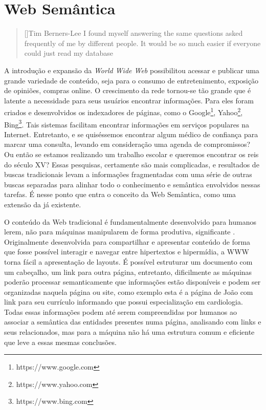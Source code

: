 \chapter{Web Semântica}

\begin{quotation}[]{Tim Berners-Lee}
I found myself answering the same questions asked frequently of me by different people. It would be so much easier if everyone could just read my database
\end{quotation}

A introdução e expansão da \textit{World Wide Web} possibilitou acessar e publicar uma grande variedade de conteúdo, seja para o consumo de entretenimento, exposição de opiniões, compras online. O crescimento da rede tornou-se tão grande que é latente a necessidade para seus usuários encontrar informações. Para eles foram criados e desenvolvidos os indexadores de páginas, como o Google\footnote{https://www.google.com}, Yahoo\footnote{https://www.yahoo.com}, Bing\footnote{https://www.bing.com}. Tais sistemas facilitam encontrar informações em serviços populares na Internet. Entretanto, e se quiséssemos encontrar algum médico de confiança para marcar uma consulta, levando em consideração uma agenda de compromissos? Ou então se estamos realizando um trabalho escolar e queremos encontrar os reis do século XV? Essas pesquisas, certamente são mais complicadas, e resultados de buscas tradicionais levam a informações fragmentadas com uma série de outras buscas separadas para alinhar todo o conhecimento e semântica envolvidos nessas tarefas. É nesse ponto que entra o conceito da Web Semântica, como uma extensão da já existente.

O conteúdo da Web tradicional é fundamentalmente desenvolvido para humanos lerem, não para máquinas manipularem de forma produtiva, significante \citep{bernerslee2001semantic}. Originalmente desenvolvida para compartilhar e apresentar conteúdo de forma que fosse possível interagir e navegar entre hipertextos e hipermídia, a WWW torna fácil a apresentação de layouts. É possível estruturar um documento com um cabeçalho, um link para outra página, entretanto, dificilmente as máquinas poderão processar semanticamente que informações estão disponíveis e podem ser organizadas naquela página ou site, como exemplo esta é a página de João com link para seu currículo informando que possui especialização em cardiologia. Todas essas informações podem até serem compreendidas por humanos ao associar a semântica das entidades presentes numa página, analisando com links e seus relacionados, mas para a máquina não há uma estrutura comum e eficiente que leve a essas mesmas conclusões.

